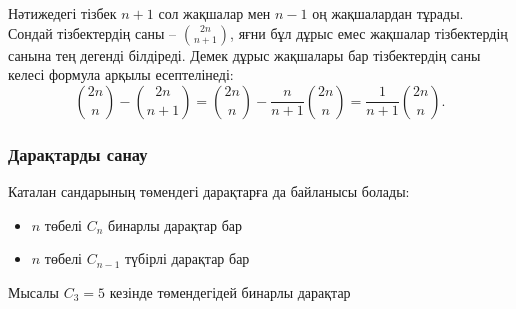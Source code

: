 
Нәтижедегі тізбек $n+1$ сол жақшалар мен 
$n-1$ оң жақшалардан тұрады. Сондай тізбектердің
саны -- ${2n \choose n+1}$, яғни бұл дұрыс емес 
жақшалар тізбектердің санына тең дегенді білдіреді. Демек
дұрыс жақшалары бар тізбектердің саны
келесі формула арқылы есептелінеді:
\[{2n \choose n}-{2n \choose n+1} = {2n \choose n} - \frac{n}{n+1} {2n \choose n} = \frac{1}{n+1} {2n \choose n}.\]


\subsubsection{Дарақтарды санау}

Каталан сандарының төмендегі дарақтарға да байланысы болады:

\begin{itemize}
\item $n$ төбелі $C_n$ бинарлы дарақтар бар
\item $n$ төбелі $C_{n-1}$ түбірлі дарақтар бар
\end{itemize}
\noindent
Мысалы $C_3=5$ кезінде төмендегідей бинарлы дарақтар 



